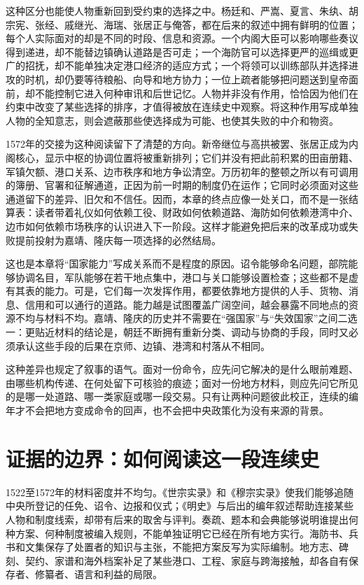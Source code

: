 这种区分也能使人物重新回到受约束的选择之中。杨廷和、严嵩、夏言、朱纨、胡宗宪、张经、戚继光、海瑞、张居正与俺答，都在后来的叙述中拥有鲜明的位置；每个人实际面对的却是不同的时段、信息和资源。一个内阁大臣可以影响哪些奏议得到递进，却不能替边镇确认道路是否可走；一个海防官可以选择更严的巡缉或更广的招抚，却不能单独决定港口经济的适应方式；一个将领可以训练部队并选择进攻的时机，却仍要等待粮船、向导和地方协力；一位上疏者能够把问题送到皇帝面前，却不能控制它进入何种审讯和后世记忆。人物并非没有作用，恰恰因为他们在约束中改变了某些选择的排序，才值得被放在连续史中观察。将这种作用写成单独人物的全知意志，则会遮蔽那些使选择成为可能、也使其失败的中介和物资。

1572年的交接为这种阅读留下了清楚的方向。新帝继位与高拱被罢、张居正成为内阁核心，显示中枢的协调位置将被重新排列；它们并没有把此前积累的田亩册籍、军镇欠额、港口关系、边市秩序和地方争讼清空。万历初年的整顿之所以有可调用的簿册、官署和征解通道，正因为前一时期的制度仍在运作；它同时必须面对这些通道留下的差异、旧欠和不信任。因而，本章的终点应像一处关口，而不是一张结算表：读者带着礼仪如何依赖工役、财政如何依赖道路、海防如何依赖港湾中介、边市如何依赖市场秩序的认识进入下一阶段。这样才能避免把后来的改革成功或失败提前投射为嘉靖、隆庆每一项选择的必然结局。

这也是本章将“国家能力”写成关系而不是程度的原因。诏令能够命名问题，部院能够协调名目，军队能够在若干地点集中，港口与关口能够设置检查；这些都不是虚有其表的能力。可是，它们每一次发挥作用，都要依靠地方提供的人手、货物、消息、信用和可以通行的道路。能力越是试图覆盖广阔空间，越会暴露不同地点的资源不均与材料不均。嘉靖、隆庆的历史并不需要在“强国家”与“失效国家”之间二选一：更贴近材料的结论是，朝廷不断拥有重新分类、调动与协商的手段，同时又必须承认这些手段的后果在京师、边镇、港湾和村落从不相同。

这种差异也规定了叙事的语气。面对一份命令，应先问它解决的是什么眼前难题、由哪些机构传递、在何处留下可核验的痕迹；面对一份地方材料，则应先问它所见的是哪一处道路、哪一类家庭或哪一段交易。只有让两种问题彼此校正，连续的编年才不会把地方变成命令的回声，也不会把中央政策化为没有来源的背景。

\section{证据的边界：如何阅读这一段连续史}

1522至1572年的材料密度并不均匀。《世宗实录》和《穆宗实录》使我们能够追随中央所登记的任免、诏令、边报和仪式；《明史》与后出的编年叙述帮助连接某些人物和制度线索，却带有后来的取舍与评判。奏疏、题本和会典能够说明谁提出何种方案、何种制度被编入规则，不能单独证明它已经在所有地方实行。海防书、兵书和文集保存了处置者的知识与主张，不能把方案反写为实际编制。地方志、碑刻、契约、家谱和海外档案补足了某些港口、工程、家庭与跨海接触，却各自有保存者、修纂者、语言和利益的局限。

